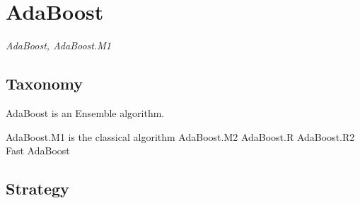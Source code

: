 
\section{AdaBoost} 
\label{sec:adaboost}

\emph{AdaBoost, AdaBoost.M1}

\subsection{Taxonomy}
AdaBoost is an Ensemble algorithm.


AdaBoost.M1 is the classical algorithm
AdaBoost.M2
AdaBoost.R
AdaBoost.R2
Fast AdaBoost


\subsection{Strategy}


